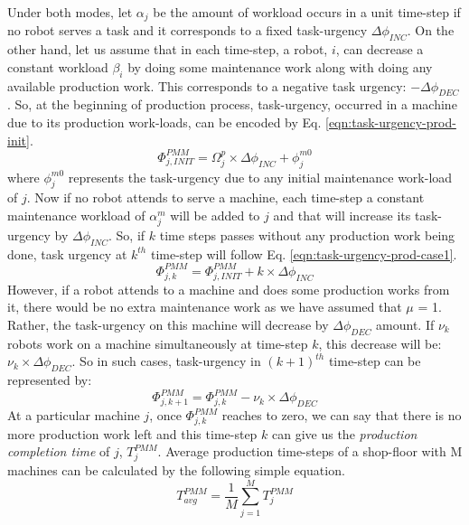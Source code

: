 \documentclass[preprint,12pt]{elsarticle}
\begin{document}
Under both modes, let $\alpha_{j}$ be the amount of workload occurs in a unit time-step if no robot serves a task and it corresponds to a fixed task-urgency $\Delta \phi_{INC}$. On the other hand, let us assume that in each time-step, a robot, $i$, can decrease a constant workload $\beta_{i}$ by doing some maintenance work along with doing any available production work. This  corresponds to a negative task urgency: $- \Delta \phi_{DEC}$. So, at the beginning of production process, task-urgency, occurred in a machine due to its production work-loads, can be encoded by Eq. \ref{eqn:task-urgency-prod-init}.
\begin{equation}
\Phi_{j, INIT}^{PMM} = \Omega_{j}^{p} \times \Delta \phi_{INC} + \phi_{j}^{m0}
\label{eqn:task-urgency-prod-init}
\end{equation}
where $\phi_{j}^{m0}$ represents the task-urgency due to any initial maintenance work-load of $j$.
Now if no robot attends to serve a machine, each time-step a constant maintenance workload of $\alpha_{j}^{m}$ will be added to $j$ and that will increase its task-urgency by $\Delta \phi_{INC}$. So, if $k$ time steps passes without any production work being done, task urgency at $k^{th}$ time-step will follow Eq. \ref{eqn:task-urgency-prod-case1}.
\begin{equation}
\Phi_{j, k}^{PMM} =\Phi_{j, INIT}^{PMM} + k \times \Delta \phi_{INC}
\label{eqn:task-urgency-prod-case1}
\end{equation}
However, if a robot attends to a machine and does some production works from it, there would be no extra maintenance work as we have assumed that $\mu$ = 1. Rather, the task-urgency on this machine will decrease by $\Delta \phi_{DEC}$ amount. If $\nu_{k}$ robots work on a machine simultaneously at time-step $k$, this decrease will be: $\nu_{k} \times \Delta \phi_{DEC}$. So in such cases, task-urgency in $(k+1)^{th}$ time-step can be represented by:
\begin{equation}
\Phi_{j, k+1}^{PMM} = \Phi_{j, k}^{PMM} - \nu_{k} \times \Delta \phi_{DEC}
\label{eqn:task-urgency-prod-case2}
\end{equation}
At a particular machine $j$, once $\Phi_{j, k}^{PMM}$ reaches to zero, we can say that there is no more production work left and this time-step $k$ can give us the {\em production completion time} of $j$, $T_{j}^{PMM}$. Average production time-steps of a shop-floor with M machines can be calculated by the following simple equation.
\begin{equation}
T_{avg}^{PMM} = \frac{1}{M} \sum_{j=1}^{M} T_{j}^{PMM} 
\label{eqn:avg-pmm}
\end{equation}
\end{document}
